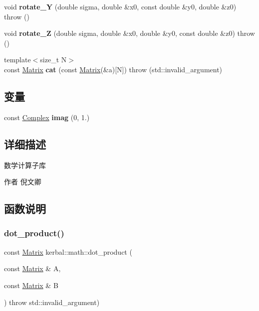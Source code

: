 \begin{DoxyCompactItemize}
void {\bfseries rotate\+\_\+Y} (double sigma, double \&x0, const double \&y0, double \&z0)  throw ()
\item 
\mbox{\label{namespacekerbal_1_1math_ae2c2044405fa1e952ccb07dae1a61111}} 
void {\bfseries rotate\+\_\+Z} (double sigma, double \&x0, double \&y0, const double \&z0)  throw ()
\item 
\mbox{\label{namespacekerbal_1_1math_aac8c0ee9511d7ac59fdca86e0d7a5ef9}} 
{\footnotesize template$<$size\+\_\+t N$>$ }\\const \hyperlink{classkerbal_1_1math_1_1_matrix}{Matrix} {\bfseries cat} (const \hyperlink{classkerbal_1_1math_1_1_matrix}{Matrix}(\&a)\mbox{[}N\mbox{]})  throw (std\+::invalid\+\_\+argument)
\end{DoxyCompactItemize}
\subsection*{变量}
\begin{DoxyCompactItemize}
\item 
\mbox{\label{namespacekerbal_1_1math_adc49ad4c9edcaf888781cccfd0a07944}} 
const \hyperlink{classkerbal_1_1math_1_1_complex}{Complex} {\bfseries imag} (0, 1.)
\end{DoxyCompactItemize}


\subsection{详细描述}
数学计算子库 

\begin{DoxyAuthor}{作者}
倪文卿 
\end{DoxyAuthor}


\subsection{函数说明}
\mbox{\label{namespacekerbal_1_1math_a456d9abf69b41eb8edb6b7f09822b689}} 
\subsubsection{\texorpdfstring{dot\+\_\+product()}{dot\_product()}}
{\footnotesize\ttfamily const \hyperlink{classkerbal_1_1math_1_1_matrix}{Matrix} kerbal\+::math\+::dot\+\_\+product (\begin{DoxyParamCaption}\item[{const \hyperlink{classkerbal_1_1math_1_1_matrix}{Matrix} \&}]{A,  }\item[{const \hyperlink{classkerbal_1_1math_1_1_matrix}{Matrix} \&}]{B }\end{DoxyParamCaption}) throw  std\+::invalid\+\_\+argument) }


